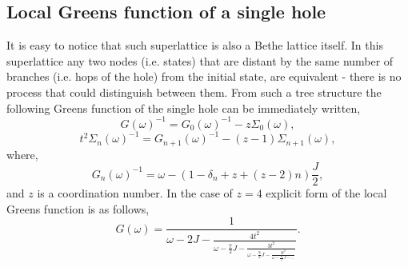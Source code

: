 \documentclass{article}
\begin{document}
\subsection{Local Greens function of a single hole}
It is easy to notice that such superlattice is also a Bethe lattice itself. In this superlattice any two nodes (i.e. states) that are distant by the same number of branches (i.e. hops of the hole) from the initial state, are equivalent - there is no process that could distinguish between them. From such a tree structure the following Greens function of the single hole can be immediately written,
\begin{equation}
    G(\omega)^{-1} = G_0(\omega)^{-1} - z\Sigma_0(\omega), 
\end{equation}
\begin{equation}
    t^2\Sigma_n(\omega)^{-1} = G_{n+1}(\omega)^{-1} - (z-1)\Sigma_{n+1}(\omega),
\end{equation}
where,
\begin{equation}
    G_{n}(\omega)^{-1} = \omega - \left(
        1 - \delta_{n} + z + \left( z-2 \right) n 
    \right)\frac{J}{2},
\end{equation}
and $z$ is a coordination number. In the case of $z=4$ explicit form of the local Greens function is as follows,
\begin{equation}
    G(\omega) = \frac{1}{
        \omega - 2J - \frac{4t^2}{
            \omega - \frac{7}{2}J - \frac{3t^2}{
                \omega - \frac{9}{2}J - \frac{3t^2}{
                    \omega - \frac{11}{2}J - \hdots
                }
            }
        }
    }.
\label{eq:BetheGF}
\end{equation}
\end{document}
